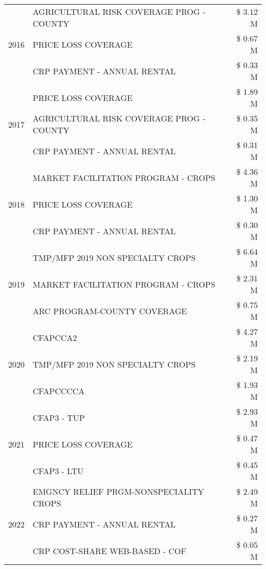\begin{tabular}{llr}
\cline{1-3}
\multirow[t]{3}{*}{2016} & AGRICULTURAL RISK COVERAGE PROG - COUNTY & \$ 3.12 M \\
 & PRICE LOSS COVERAGE & \$ 0.67 M \\
 & CRP PAYMENT - ANNUAL RENTAL & \$ 0.33 M \\
\cline{1-3}
\multirow[t]{3}{*}{2017} & PRICE LOSS COVERAGE & \$ 1.89 M \\
 & AGRICULTURAL RISK COVERAGE PROG - COUNTY & \$ 0.35 M \\
 & CRP PAYMENT - ANNUAL RENTAL & \$ 0.31 M \\
\cline{1-3}
\multirow[t]{3}{*}{2018} & MARKET FACILITATION PROGRAM - CROPS & \$ 4.36 M \\
 & PRICE LOSS COVERAGE & \$ 1.30 M \\
 & CRP PAYMENT - ANNUAL RENTAL & \$ 0.30 M \\
\cline{1-3}
\multirow[t]{3}{*}{2019} & TMP/MFP 2019 NON SPECIALTY CROPS & \$ 6.64 M \\
 & MARKET FACILITATION PROGRAM - CROPS & \$ 2.31 M \\
 & ARC PROGRAM-COUNTY COVERAGE & \$ 0.75 M \\
\cline{1-3}
\multirow[t]{3}{*}{2020} & CFAPCCA2 & \$ 4.27 M \\
 & TMP/MFP 2019 NON SPECIALTY CROPS & \$ 2.19 M \\
 & CFAPCCCCA & \$ 1.93 M \\
\cline{1-3}
\multirow[t]{3}{*}{2021} & CFAP3 - TUP & \$ 2.93 M \\
 & PRICE LOSS COVERAGE & \$ 0.47 M \\
 & CFAP3 - LTU & \$ 0.45 M \\
\cline{1-3}
\multirow[t]{3}{*}{2022} & EMGNCY RELIEF PRGM-NONSPECIALITY CROPS & \$ 2.49 M \\
 & CRP PAYMENT - ANNUAL RENTAL & \$ 0.27 M \\
 & CRP COST-SHARE WEB-BASED - COF & \$ 0.05 M \\
\cline{1-3}
\bottomrule
\end{tabular}
